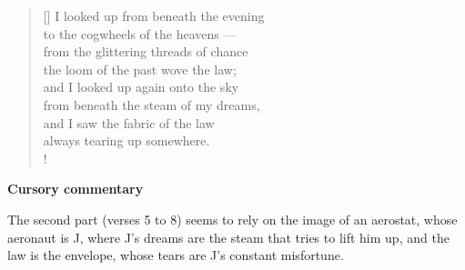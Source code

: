\documentclass[a4paper,12pt,twoside,final]{book}
\begin{document}
\newpage


\settowidth{\versewidth}{from under the steam of my dreams,}

\begin{verse}[\versewidth]
  I looked up from beneath the evening \\
  to the cogwheels of the heavens --- \\
  from the glittering threads of chance \\
  the loom of the past wove the law; \\
  and I looked up again onto the sky \\
  from beneath the steam of my dreams, \\
  and I saw the fabric of the law \\
  always tearing up somewhere. \\!
\end{verse}


\bigskip

\noindent \textbf{Cursory commentary}

\medskip

The second part (verses 5 to 8) seems to rely on the image of an
aerostat, whose aeronaut is J, where J's dreams are the steam that
tries to lift him up, and the law is the envelope, whose tears are J's
constant misfortune.

\newpage

\settowidth{\versewidth}{törvényt szőtt a mult szövőszéke}
\end{document}
